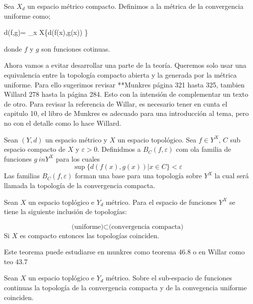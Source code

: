 \begin{df}
Sea $X_d$ un espacio métrico compacto. Definimos a la métrica de la convergencia uniforme como;

d(f,g)= \max_{x \in X}\{d(f(x),g(x)) \}
\end{df}

donde $f$ y $g$ son funciones cotinuas. 


Ahora vamos a evitar desarrollar una parte de la teoría. Queremos solo usar una equivalencia entre la topología compacto abierta y la generada por la métrica uniforme. Para ello sugerimos revisar **Munkres página 321 hasta 325, tambien Willard 278 hasta la página 284. Esto con la intensión de complementar un texto de otro. Para revisar la referencia de Willar, es necesario tener en cunta el capitulo 10, el libro de Munkres es adecuado para una introducción al tema, pero no con el detalle como lo hace Willard.

\begin{df}
Sean $(Y,d)$ un espacio métrico y $X$ un espacio topológico. Sea $f\in Y^X$, $C$ sub espacio compacto de $X$ y $\varepsilon > 0$. Definidmos a $B_C(f, \varepsilon)$ com ola familia de funciones $g \ in Y ^X$ para los cuales
$$\sup \{d(f(x),g(x))|x \in C \} < \varepsilon$$
Las familias  $B_C(f,\varepsilon)$ forman una base para una topología sobre $Y^X$ la cual será llamada la topología de la convergencia compacta.  
\end{df}


\begin{te}
Sean $X$ un espacio toplógico e $Y_d $ métrico. Para el espacio de funciones $Y^X$ se tiene la siguiente inclusión de topologías:

$$\text{(uniforme)} \subset \text{(convergencia compacta)}$$ 
Si $X$ es compacto entonces las topologías coinciden. 
\end{te}

Este teorema puede estudiarse en munkres como teorema 46.8 o en Willar como teo 43.7

\begin{te}
Sean $X$ un espacio toplógico e $Y_d $ métrico. Sobre el sub-espacio de funciones continuas la topología de la convergencia compacta y de la convegencia uniforme coinciden. 
\end{te}

